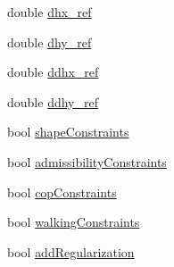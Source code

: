 \begin{DoxyCompactItemize}
double \hyperlink{structMIQPParameters_a97a8deb8aeda727c99dc501b4516a24e}{dhx\-\_\-ref}
\item 
double \hyperlink{structMIQPParameters_a816bb15b6417ac8387adbaac2f74e198}{dhy\-\_\-ref}
\item 
double \hyperlink{structMIQPParameters_a71dab92bc2eebbdf5e2d592c092e7f52}{ddhx\-\_\-ref}
\item 
double \hyperlink{structMIQPParameters_a996553605ecfefa749bde01bc4e7b2a9}{ddhy\-\_\-ref}
\item 
bool \hyperlink{structMIQPParameters_a718ac69205eb5fbb51f58cd59176a3ff}{shape\-Constraints}
\item 
bool \hyperlink{structMIQPParameters_ae8e541722b3e3664ab516676aa1c16be}{admissibility\-Constraints}
\item 
bool \hyperlink{structMIQPParameters_a3a0fd04f9e8767097e44e02a740796bc}{cop\-Constraints}
\item 
bool \hyperlink{structMIQPParameters_af7cbaa08836e17417f9f5c170b55f1bc}{walking\-Constraints}
\item 
bool \hyperlink{structMIQPParameters_a7e5417e18e6797739def8f916c3efc40}{add\-Regularization}
\end{DoxyCompactItemize}



